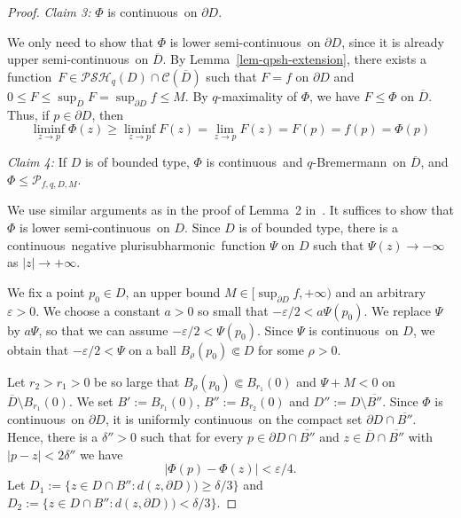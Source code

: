 \documentclass[10pt,a4paper]{amsart}
\numberwithin{equation}{section}
\newcommand{\TP}[1]{\textcolor{red}{[#1]}}
\newcommand{\ccal}{\mathcal{C}}
\newcommand{\pcal}{\mathcal{P}}
\newcommand{\qbrem}{$q$-Bremermann}
\newcommand{\psh}{pluri\-sub\-harmonic}
\newcommand{\qpsh}{$q$-pluri\-sub\-harmonic}
\newcommand{\PSH}{\mathcal{PSH}}
\newcommand{\cl}[1]{\overline{#1}}
\newcommand{\cont}{continuous}
\newcommand{\usc}{upper semi-continuous}
\newcommand{\lsc}{lower semi-continuous}
\newcommand{\fct}{function}
\newcommand{\cld}{\overline{D}}
\newcommand{\relc}{\Subset}
\newcommand{\eps}{\varepsilon}
\begin{document}
\begin{proof}
\medskip

\textit{Claim 3:} $\Phi$ is \cont\ on $\partial D$.

\medskip

We only need to show that $\Phi$ is \lsc\ on $\partial D$, since it is already \usc\ on $\cld$. By Lemma~\ref{lem-qpsh-extension}, there exists a \fct\ $F \in \PSH_q(D)\cap\ccal(\cld)$ such that $F=f$ on $\partial D$ and $0 \leq F \leq \sup_{\cld} F = \sup_{\partial D} f \leq M$. By $q$-maximality of $\Phi$, we have $F\leq\Phi$ on $\cld$. Thus, if $p \in \partial D$, then
\[
\liminf_{z \to p} \Phi(z) \geq \liminf_{z \to p} F(z) = \lim_{z \to p} F(z) = F(p)=f(p)=\Phi(p)
\]




\medskip

\textit{Claim 4:} If $D$ is of bounded type, $\Phi$ is \cont\ and \qbrem\ on $\cl D$, and $\Phi \leq\pcal_{f,q,D,M}$.

\medskip

We use similar arguments as in the proof of Lemma~2 in~\cite{SiTo}. It suffices to show that $\Phi$ is \lsc\ on $D$. Since $D$ is of bounded type, there is a \cont\ negative \psh\ function $\Psi$ on $D$ such that $\Psi(z) \to -\infty$ as $|z|\to+\infty$.

We fix a point $p_0 \in D$, an upper bound $M \in [\sup_{\partial D} f,+\infty)$ and an arbitrary $\eps>0$. We choose a constant $a>0$ so small that $-\eps/2 < a\Psi(p_0)$. We replace $\Psi$ by $a\Psi$, so that we can assume $-\eps/2 < \Psi(p_0)$. Since $\Psi$ is \cont\ on $D$, we obtain that $-\eps/2 < \Psi$ on a ball $B_{\rho}(p_0) \relc D$ for some $\rho>0$.

Let $r_2>r_1>0$ be so large that $B_{\rho}(p_0) \relc B_{r_1}(0)$ and $\Psi +M < 0$ on $\cld \setminus B_{r_1}(0)$. We set $B':=B_{r_1}(0)$, $B'':=B_{r_2}(0)$ and $D'':=D\setminus \cl{B''}$.
Since $\Phi$ is \cont\ on $\partial D$, it is uniformly \cont\ on the compact set $\partial D \cap \cl{B''}$. Hence, there is a $\delta''>0$ such that for every $p \in \partial D \cap \cl{B''}$ and $z \in \cld \cap \cl{B''}$ with $|p-z|<2\delta''$ we have
\[
|\Phi(p) - \Phi(z)| < \eps/4.
\]
Let $D_1:=\{z \in D \cap B'' : d(z,\partial D)) \geq \delta/3\}$ and $D_2:=\{z \in D \cap B'' : d(z,\partial D)) < \delta/3\}$.



\end{proof}
\end{document}
